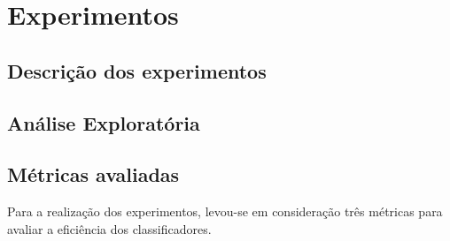 \chapter{Experimentos}

\section{Descrição dos experimentos}

\section{Análise Exploratória}

\section{Métricas avaliadas}

Para a realização dos experimentos, levou-se em consideração três métricas
para avaliar a eficiência dos classificadores.